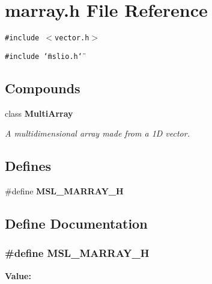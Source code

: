 \section{marray.h File Reference}
\label{marray_8h}
{\tt \#include $<$vector.h$>$}\par
{\tt \#include \char`\"{}mslio.h\char`\"{}}\par
\subsection*{Compounds}
\begin{CompactItemize}
\item 
class {\bf Multi\-Array}
\begin{CompactList}\small\item\em A multidimensional array made from a 1D vector.\item\end{CompactList}\end{CompactItemize}
\subsection*{Defines}
\begin{CompactItemize}
\item 
\#define {\bf MSL\_\-MARRAY\_\-H}
\end{CompactItemize}


\subsection{Define Documentation}
\subsubsection{\setlength{\rightskip}{0pt plus 5cm}\#define MSL\_\-MARRAY\_\-H}\label{marray_8h_a0}


{\bf Value:}\footnotesize\begin{verbatim}
\end{verbatim}\normalsize 
